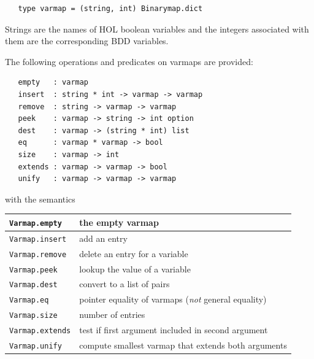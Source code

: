 \documentclass[12pt,fleqn]{book}
\renewcommand{\t}[1]{\mbox{\tt #1}}
\begin{document}
\begin{verbatim}
   type varmap = (string, int) Binarymap.dict
\end{verbatim}

\vspace*{-2mm}

Strings are the names of HOL boolean variables and the integers associated with them
are the corresponding BDD variables.

The following operations and predicates on varmaps are provided:

\begin{verbatim}
   empty   : varmap
   insert  : string * int -> varmap -> varmap
   remove  : string -> varmap -> varmap
   peek    : varmap -> string -> int option
   dest    : varmap -> (string * int) list
   eq      : varmap * varmap -> bool
   size    : varmap -> int
   extends : varmap -> varmap -> bool
   unify   : varmap -> varmap -> varmap
\end{verbatim}

with the semantics

\bigskip

\begin{tabular}{|l|l|} \hline
\t{Varmap.empty} &    the empty varmap \\ \hline
\t{Varmap.insert} &   add an entry \\ \hline
\t{Varmap.remove} &   delete an entry for a variable \\ \hline
\t{Varmap.peek} &     lookup the value of a variable \\ \hline
\t{Varmap.dest} &     convert to a list of pairs \\ \hline
\t{Varmap.eq} &       pointer equality of varmaps ({\it not} general equality) \\ \hline
\t{Varmap.size} &     number of entries \\ \hline
\t{Varmap.extends} &  test if first argument included in second argument\\ \hline
\t{Varmap.unify} &  compute smallest varmap that extends both arguments\\ \hline
\end{tabular}
\end{document}
